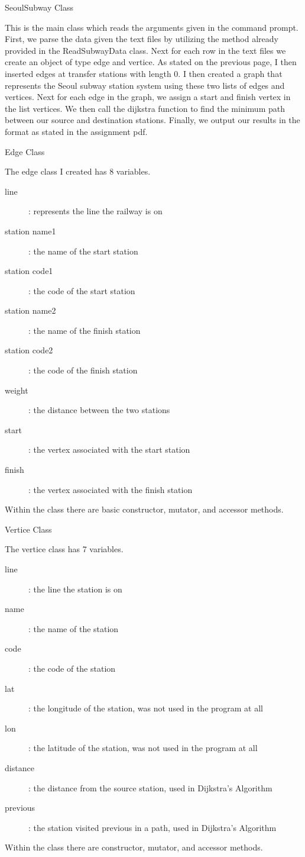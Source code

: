 \documentclass{article}
\begin{document}
\begin{center} SeoulSubway Class \end{center}
This is the main class which reads the arguments given in the command prompt. First, we parse the data given the text files by utilizing the method already provided in the ReadSubwayData class. Next for each row in the text files we create an object of type edge and vertice. As stated on the previous page, I then inserted edges at transfer stations with length 0. I then created a graph that represents the Seoul subway station system using these two lists of edges and vertices. Next for each edge in the graph, we assign a start and finish vertex in the list vertices. We then call the dijkstra function to find the minimum path between our source and destination stations. Finally, we output our results in the format as stated in the assignment pdf.

\begin{center} Edge Class \end{center}
The edge class I created has 8 variables.
 
\begin{description}
	\item[line]: represents the line the railway is on
	\item[station name1]:  the name of the start station
	\item[station code1]: the code of the start station
	\item[station name2]: the name of the finish station
	\item[station code2]: the code of the finish station
	\item[weight]: the distance between the two stations
	\item[start]: the vertex associated with the start station
	\item[finish]: the vertex associated with the finish station
\end{description}
Within the class there are basic constructor, mutator, and accessor methods.

\begin{center} Vertice Class \end{center}
The vertice class has 7 variables.
\begin{description}
	\item[line]: the line the station is on
	\item[name]: the name of the station
	\item[code]: the code of the station
	\item[lat]: the longitude of the station, was not used in the program at all
	\item[lon]: the latitude of the station, was not used in the program at all
	\item[distance]: the distance from the source station, used in Dijkstra's Algorithm
	\item[previous]: the station visited previous in a path, used in Dijkstra's Algorithm
\end{description}
Within the class there are constructor, mutator, and accessor methods.
\clearpage
\end{document}

